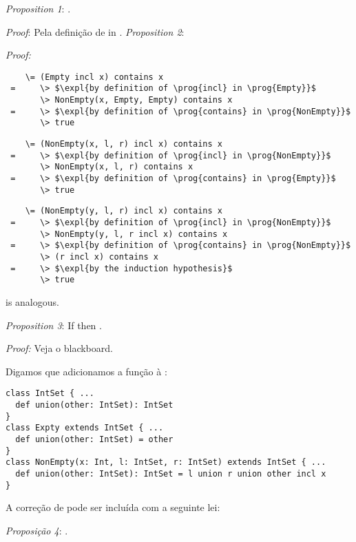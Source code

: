 {\emph{Proposition 1}: .

\emph{Proof}: Pela definição de  in .
\es\bs
\emph{Proposition 2}: 

\emph{Proof:}

\begin{lstlisting}
    \= (Empty incl x) contains x
 =     \> $\expl{by definition of \prog{incl} in \prog{Empty}}$
       \> NonEmpty(x, Empty, Empty) contains x
 =     \> $\expl{by definition of \prog{contains} in \prog{NonEmpty}}$
       \> true
\end{lstlisting}

\begin{lstlisting}
    \= (NonEmpty(x, l, r) incl x) contains x
 =     \> $\expl{by definition of \prog{incl} in \prog{NonEmpty}}$
       \> NonEmpty(x, l, r) contains x
 =     \> $\expl{by definition of \prog{contains} in \prog{Empty}}$
       \> true
\end{lstlisting}
\es\bs
{}
\begin{lstlisting}
    \= (NonEmpty(y, l, r) incl x) contains x
 =     \> $\expl{by definition of \prog{incl} in \prog{NonEmpty}}$
       \> NonEmpty(y, l, r incl x) contains x
 =     \> $\expl{by definition of \prog{contains} in \prog{NonEmpty}}$
       \> (r incl x) contains x
 =     \> $\expl{by the induction hypothesis}$
       \> true
\end{lstlisting}

 is analogous.

\bigskip

\emph{Proposition 3}: If  then
.

\emph{Proof:} Veja o blackboard.
\es
{}

Digamos que adicionamos a função  à  :
\begin{lstlisting}
class IntSet { ...
  def union(other: IntSet): IntSet
}
class Expty extends IntSet { ...
  def union(other: IntSet) = other
}
class NonEmpty(x: Int, l: IntSet, r: IntSet) extends IntSet { ...
  def union(other: IntSet): IntSet = l union r union other incl x
}
\end{lstlisting}
A correção de  pode ser incluída com a seguinte lei:

\emph{Proposição 4}: 
.

}
